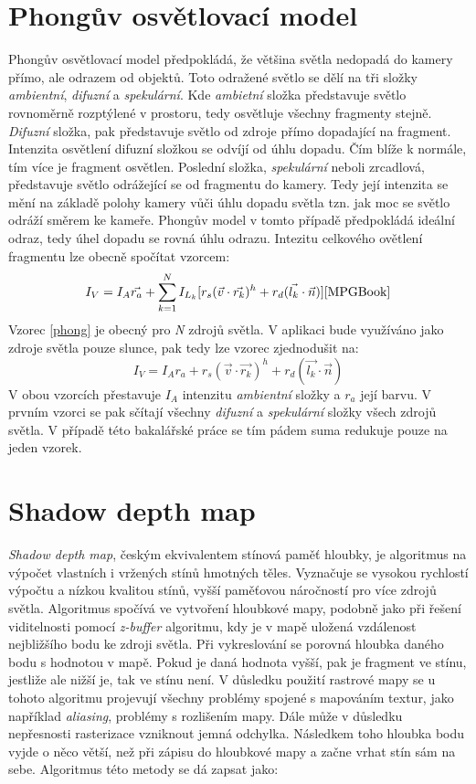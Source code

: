 \section{Phongův osvětlovací model}
Phongův osvětlovací model předpokládá, že většina světla nedopadá do kamery přímo, ale odrazem od objektů.
Toto odražené světlo se dělí na tři složky \emph{ambientní}, \emph{difuzní} a \emph{spekulární}. Kde \emph{ambietní} složka představuje světlo rovnoměrně rozptýlené v prostoru, tedy osvětluje všechny fragmenty stejně. \emph{Difuzní} složka, pak představuje světlo od zdroje  přímo dopadající na fragment. Intenzita osvětlení difuzní složkou se odvíjí od úhlu dopadu. Čím blíže k normále, tím více je fragment osvětlen. Poslední složka, \emph{spekulární} neboli zrcadlová, představuje světlo odrážející se od fragmentu do kamery. Tedy její intenzita se mění na základě polohy kamery vůči úhlu dopadu světla tzn. jak moc se světlo odráží směrem ke kameře. Phongův model v tomto případě předpokládá ideální odraz, tedy úhel dopadu se rovná  úhlu odrazu. Intezitu celkového ovětlení fragmentu lze obecně spočítat vzorcem:
\begin{equation}\label{phong}
I_V = I_A \vec{r_a} + \sum_{k=1}^{N}I_{L_k}[r_s(\vec{v}\cdot\vec{r_k})^h + r_d(\vec{l_k}\cdot\vec{n})]\cite{MPGBook}
\end{equation}
Vzorec \ref{phong} je obecný pro \emph{N} zdrojů světla. V aplikaci bude využíváno jako zdroje světla pouze slunce, pak tedy lze vzorec zjednodušit na:
\begin{equation}\label{MyPhong}
I_V = I_A r_a + r_s(\vec{v}\cdot\vec{r_k})^h + r_d(\vec{l_k}\cdot\vec{n})
\end{equation}
 V obou vzorcích přestavuje $ I_A $ intenzitu \emph{ambientní} složky a $r_a$ její barvu. V prvním vzorci se pak sčítají všechny \emph{difuzní} a \emph{spekulární} složky všech zdrojů světla. V případě této bakalářské práce se tím pádem suma redukuje pouze na jeden vzorek.

\section{Shadow depth map}\label{shadowMap}
\emph{Shadow depth map}, českým ekvivalentem stínová paměť hloubky\cite{MPGBook}, je algoritmus na výpočet vlastních i vržených stínů hmotných těles. Vyznačuje se vysokou rychlostí výpočtu a nízkou kvalitou stínů, vyšší paměťovou náročností pro více zdrojů světla. Algoritmus spočívá ve vytvoření hloubkové mapy, podobně jako při řešení viditelnosti pomocí \emph{z-buffer} algoritmu, kdy je v mapě uložená vzdálenost nejbližšího bodu ke zdroji světla. Při vykreslování se porovná hloubka daného bodu s hodnotou v mapě. Pokud je daná hodnota vyšší, pak je fragment ve stínu, jestliže ale nižší je, tak ve stínu není. V důsledku použití rastrové mapy se u tohoto algoritmu projevují všechny problémy spojené s mapováním textur, jako například \emph{aliasing}, problémy s rozlišením mapy. Dále může v důsledku nepřesnosti rasterizace vzniknout jemná odchylka. Následkem toho hloubka bodu vyjde o něco větší, než při zápisu do hloubkové mapy a začne vrhat stín sám na sebe. Algoritmus této metody se dá zapsat jako: 
\\
\\ 

